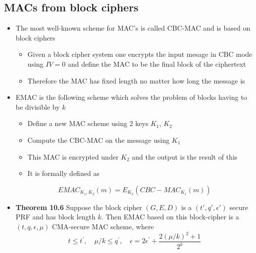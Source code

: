\subsection{MACs from block ciphers}
\begin{itemize}
  \item The most well-known scheme for MAC's is called CBC-MAC and is based on block ciphers
  \begin{itemize}
  	\item Given a block cipher system one encrypts the input mesage in CBC mode using $IV = 0$ and define the MAC to be the final block of the ciphertext
  	\item Therefore the MAC has fixed length no matter how long the message is
  \end{itemize}

  \item EMAC is the following scheme which solves the problem of blocks having to be divisible by $k$
  \begin{itemize}
  	\item Define a new MAC scheme using 2 keys $K_1$, $K_2$
  	\item Compute the CBC-MAC on the message using $K_1$
  	\item This MAC is encrypted under $K_2$ and the output is the result of this
  	\item It is formally defined as
  \end{itemize}
  \begin{equation}
    E M A C_{K_{1}, K_{2}}(m)=E_{K_{2}}\left(C B C-M A C_{K_{1}}(m)\right)
  \end{equation}

  \item \textbf{Theorem 10.6} Suppose the block cipher $(G,E,D)$ is a $(t',q',\epsilon')$ secure PRF and has block length $k$. Then EMAC based on this block-cipher is a $(t,q,\epsilon, \mu)$ CMA-secure MAC scheme, where
  \begin{equation}
    t \leq t^{\prime}, \quad \mu / k \leq q^{\prime}, \quad \epsilon=2 \epsilon^{\prime}+\frac{2(\mu / k)^{2}+1}{2^{k}}
  \end{equation}
\end{itemize}

